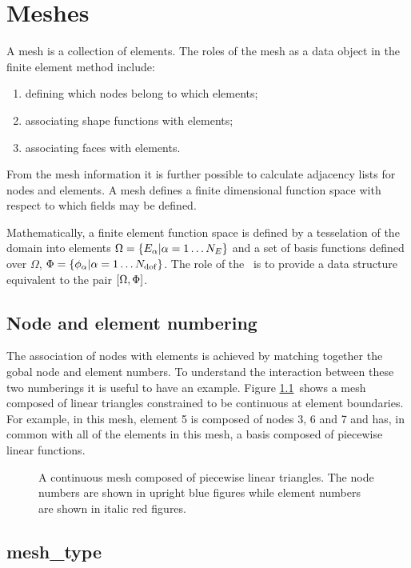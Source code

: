 \documentclass[a4paper, 11pt]{book}
\newcommand{\ifhtlatex}[2]{\ifthenelse{\boolean{HTLatex}}{#1}{#2}}
\newcommand{\targetlabel}[1]{\hypertarget{#1}{}\label{#1}}
\newcommand{\xfig}[1]{
  \ifhtlatex{
    \texttt{[image: \#1.png]}
  }{
    
  }
}
\begin{document}
\chapter{Meshes}\targetlabel{chap:meshes}

A mesh is a collection of elements. The roles of the mesh as a data object in
the finite element method include:
\begin{enumerate}
\item defining which nodes belong to which elements;
\item associating shape functions with elements;
\item associating faces with elements.
\end{enumerate}
From the mesh information it is further possible to calculate adjacency
lists for nodes and elements. A mesh defines a finite dimensional function
space with respect to which fields may be defined.

Mathematically, a finite element function space is defined by a tesselation
of the domain into elements $\Omega=\{E_\alpha|\alpha=1\ldots N_E\}$ and a set of basis
functions defined over $\Omega$, $\Phi=\{\phi_\alpha|\alpha=1\ldots N_\mathrm{dof}\}$. The role of
the \meshtype\ is to provide a data structure equivalent to the pair
$[\Omega,\Phi]$.

\section{Node and element numbering}

The association of nodes with elements is achieved by matching together the
gobal node and element numbers. To understand the interaction between these
two numberings it is useful to have an example. Figure \ref{fig:meshnumbering}\
shows a mesh composed of linear triangles constrained to be continuous at
element boundaries. For example, in this mesh, element 5 is composed of
nodes 3, 6 and 7 and has, in common with all of the elements in this mesh, a
basis composed of piecewise linear functions.

\begin{figure}[t]
  \centering
  \xfig{mesh}
  \caption{A continuous mesh composed of piecewise linear triangles. The
    node numbers are shown in upright blue figures while element numbers are
  shown in italic red figures.}
  \label{fig:meshnumbering}
\end{figure}



\section{mesh\_type}\targetlabel{type:mesh}
\end{document}

